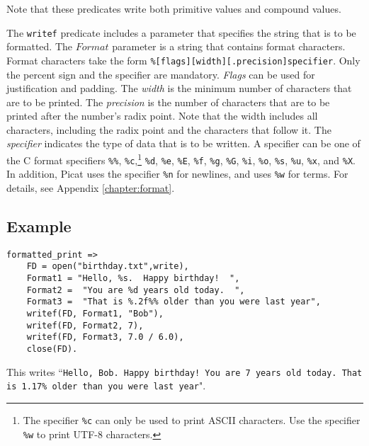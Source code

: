 Note that these predicates write both primitive values and compound values.

The \texttt{writef} predicate includes a parameter that specifies the string that is to be formatted.  The $Format$ parameter is a string that contains format characters.  Format characters take the form \texttt{\%[flags][width][.precision]specifier}.  Only the percent sign and the specifier are mandatory.  \emph{Flags} can be used for justification and padding.  The \emph{width} is the minimum number of characters that are to be printed.  The \emph{precision} is the number of characters that are to be printed after the number's radix point.  Note that the width includes all characters, including the radix point and the characters that follow it.  The \emph{specifier} indicates the type of data that is to be written.  A specifier can be one of the C format specifiers \texttt{\%\%}, \texttt{\%c},\footnote{The specifier \texttt{\%c} can only be used to print ASCII characters. Use the specifier \texttt{\%w} to print UTF-8 characters.}  \texttt{\%d}, \texttt{\%e}, \texttt{\%E}, \texttt{\%f}, \texttt{\%g}, \texttt{\%G}, \texttt{\%i}, \texttt{\%o}, \texttt{\%s}, \texttt{\%u}, \texttt{\%x}, and \texttt{\%X}.  In addition, Picat uses the specifier \texttt{\%n} for newlines, and uses \texttt{\%w} for terms.  For details, see Appendix \ref{chapter:format}.

\subsection*{Example}
\begin{verbatim}
formatted_print =>
    FD = open("birthday.txt",write),
    Format1 = "Hello, %s.  Happy birthday!  ",
    Format2 =  "You are %d years old today.  ", 
    Format3 =  "That is %.2f%% older than you were last year",
    writef(FD, Format1, "Bob"),
    writef(FD, Format2, 7),
    writef(FD, Format3, 7.0 / 6.0),
    close(FD).
\end{verbatim}

This writes ``\texttt{Hello, Bob.  Happy birthday!  You are 7 years old today.  That is 1.17\% older than you were last year}".
    
